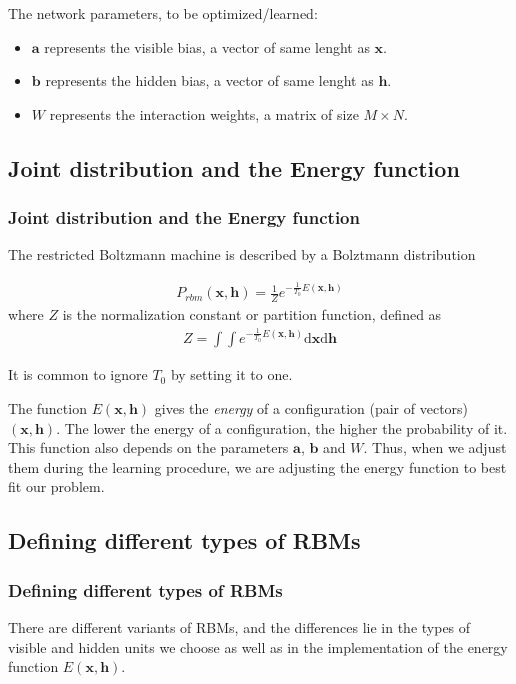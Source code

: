 \documentclass[norsk,a4paper,11pt]{beamer}
\begin{document}
\begin{frame}
The network parameters, to be optimized/learned:

\begin{itemize}
		\item $\bm{a}$ represents the visible bias, a vector of same lenght as $\bm{x}$.
		\item $\bm{b}$ represents the hidden bias, a vector of same lenght as $\bm{h}$.
		\item $W$ represents the interaction weights, a matrix of size $M\times N$.
\end{itemize}
\end{frame}


\subsection{Joint distribution and the Energy function}
\begin{frame}
\frametitle{Joint distribution and the Energy function}
The restricted Boltzmann machine is described by a Bolztmann distribution

\begin{align}
	P_{rbm}(\bm{x},\mathbf{h}) = \frac{1}{Z} e^{-\frac{1}{T_0}E(\bm{x},\mathbf{h})}
\end{align}
where $Z$ is the normalization constant or partition function, defined as 
\begin{align}
	Z = \int \int e^{-\frac{1}{T_0}E(\bm{x},\mathbf{h})} \mathrm{d} \bm{x} \mathrm{d} \mathbf{h}
\end{align}

It is common to ignore $T_0$ by setting it to one. 
\end{frame}

\begin{frame}
The function $E(\bm{x},\mathbf{h})$ gives the \textit{energy} of a configuration (pair of vectors) $(\bm{x}, \bm{h})$. The lower the energy of a configuration, the higher the probability of it. This function also depends on the parameters $\bm{a}$, $\bm{b}$ and $W$. Thus, when we adjust them during the learning procedure, we are adjusting the energy function to best fit our problem.
\end{frame}

\subsection{Defining different types of RBMs}
\begin{frame}
\frametitle{Defining different types of RBMs}
There are different variants of RBMs, and the differences lie in the types of visible and hidden units we choose as well as in the implementation of the energy function $E(\bm{x},\mathbf{h})$. 
\end{frame}
\end{document}
